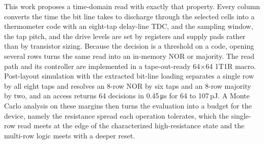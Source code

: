This work proposes a time-domain read with exactly that property.
Every column converts the time the bit line takes to discharge through the selected cells into a thermometer code with an eight-tap delay-line TDC, and the sampling window, the tap pitch, and the drive levels are set by registers and supply pads rather than by transistor sizing.
Because the decision is a threshold on a code, opening several rows turns the same read into an in-memory NOR or majority.
The read path and its controller are implemented in a tape-out-ready 64$\times$64 1T1R macro.
Post-layout simulation with the extracted bit-line loading separates a single row by all eight taps and resolves an 8-row NOR by six taps and an 8-row majority by two, and an access returns 64 decisions in 0.45\,\si{\micro\second} for 64 to 107\,pJ.
A Monte Carlo analysis on these margins then turns the evaluation into a budget for the device, namely the resistance spread each operation tolerates, which the single-row read meets at the edge of the characterized high-resistance state and the multi-row logic meets with a deeper reset.
